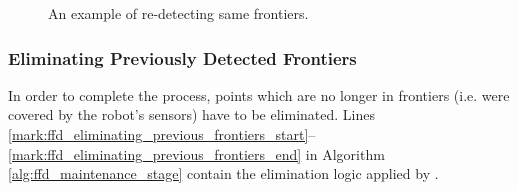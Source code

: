 	\begin{figure}
	 \centering
	 \caption{An example of re-detecting same frontiers.}
	 \label{fig:redetecting_examples}
	\end{figure}

	\subsubsection{Eliminating Previously Detected Frontiers}
	\label{section:frontier_elimination}
	In order to complete the process, points which are no longer in frontiers  (i.e. were
	covered by the robot's sensors) have to be eliminated. Lines
	\ref{mark:ffd_eliminating_previous_frontiers_start}--\ref{mark:ffd_eliminating_previous_frontiers_end}
	in Algorithm \ref{alg:ffd_maintenance_stage} contain the elimination logic
	applied by \FFD.

